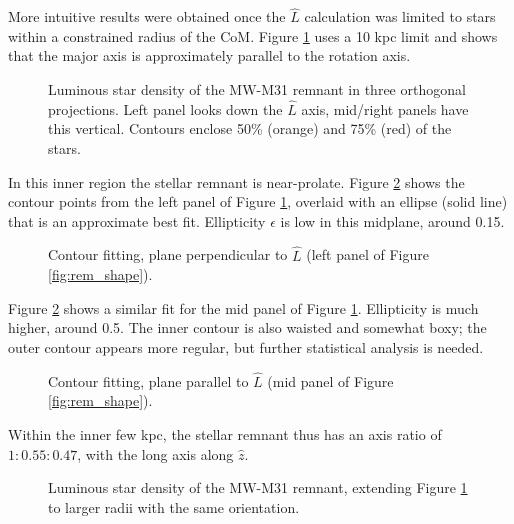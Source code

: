 \documentclass[twocolumn]{aastex63}
\begin{document}
More intuitive results were obtained once the $\hat{L}$ calculation was limited to stars within a constrained radius of the CoM.  Figure \ref{fig:rem_shape_10} uses a 10 kpc limit and shows that the major axis is approximately parallel to the rotation axis.

\begin{figure}[htb!]
	\caption{Luminous star density of the MW-M31 remnant in three orthogonal projections. Left panel looks down the $\hat{L}$ axis, mid/right panels have this vertical. Contours enclose 50\% (orange) and 75\% (red) of the stars.
		\label{fig:rem_shape_10}}
\end{figure}

In this inner region the stellar remnant is near-prolate. Figure \ref{fig:isophote_xy} shows the contour points from the left panel of Figure \ref{fig:rem_shape_10}, overlaid with an ellipse (solid line) that is an approximate best fit. Ellipticity $\epsilon$ is low in this midplane, around 0.15.

\begin{figure}[htb!]
	\caption{Contour fitting, plane perpendicular to $\hat{L}$ (left panel of Figure \ref{fig:rem_shape}).
		\label{fig:isophote_xy}}
\end{figure}

Figure \ref{fig:isophote_xy} shows a similar fit for the mid panel of Figure \ref{fig:rem_shape_10}. Ellipticity is much higher, around 0.5. The inner contour is also waisted and somewhat boxy; the outer contour appears more regular, but further statistical analysis is needed.

\begin{figure}[htb!]
	\caption{Contour fitting, plane parallel to $\hat{L}$ (mid panel of Figure \ref{fig:rem_shape}).
		\label{fig:isophote_xz}}
\end{figure}

Within the inner few kpc, the stellar remnant thus has an axis ratio of $1:0.55:0.47$, with the long axis along $\hat{z}$. 

\begin{figure}[htb!]
	\caption{Luminous star density of the MW-M31 remnant, extending Figure \ref{fig:rem_shape_10} to larger radii with the same orientation.
		\label{fig:rem_shape_40}}
\end{figure}
\end{document}
